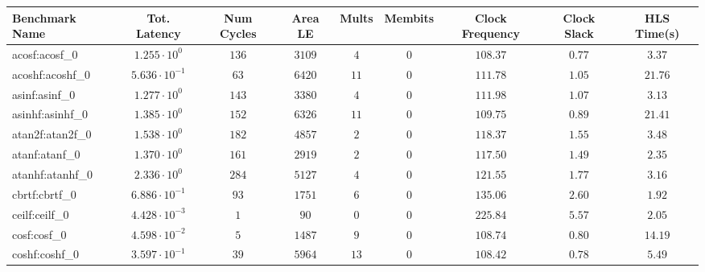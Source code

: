\begin{tabular}{|l|c|c|c|c|c|c|c|c|}
\hline
Benchmark Name               & Tot. Latency            & Num Cycles & Area LE    & Mults   & Membits & Clock Frequency & Clock Slack & HLS Time(s) \\
\hline
acosf:acosf\_0               & $ 1.255 \cdot 10^{0}  $ & $ 136    $ & $ 3109   $ & $ 4   $ & $ 0   $ & $ 108.37      $ & $ 0.77    $ & $ 3.37    $ \\
acoshf:acoshf\_0             & $ 5.636 \cdot 10^{-1} $ & $ 63     $ & $ 6420   $ & $ 11  $ & $ 0   $ & $ 111.78      $ & $ 1.05    $ & $ 21.76   $ \\
asinf:asinf\_0               & $ 1.277 \cdot 10^{0}  $ & $ 143    $ & $ 3380   $ & $ 4   $ & $ 0   $ & $ 111.98      $ & $ 1.07    $ & $ 3.13    $ \\
asinhf:asinhf\_0             & $ 1.385 \cdot 10^{0}  $ & $ 152    $ & $ 6326   $ & $ 11  $ & $ 0   $ & $ 109.75      $ & $ 0.89    $ & $ 21.41   $ \\
atan2f:atan2f\_0             & $ 1.538 \cdot 10^{0}  $ & $ 182    $ & $ 4857   $ & $ 2   $ & $ 0   $ & $ 118.37      $ & $ 1.55    $ & $ 3.48    $ \\
atanf:atanf\_0               & $ 1.370 \cdot 10^{0}  $ & $ 161    $ & $ 2919   $ & $ 2   $ & $ 0   $ & $ 117.50      $ & $ 1.49    $ & $ 2.35    $ \\
atanhf:atanhf\_0             & $ 2.336 \cdot 10^{0}  $ & $ 284    $ & $ 5127   $ & $ 4   $ & $ 0   $ & $ 121.55      $ & $ 1.77    $ & $ 3.16    $ \\
cbrtf:cbrtf\_0               & $ 6.886 \cdot 10^{-1} $ & $ 93     $ & $ 1751   $ & $ 6   $ & $ 0   $ & $ 135.06      $ & $ 2.60    $ & $ 1.92    $ \\
ceilf:ceilf\_0               & $ 4.428 \cdot 10^{-3} $ & $ 1      $ & $ 90     $ & $ 0   $ & $ 0   $ & $ 225.84      $ & $ 5.57    $ & $ 2.05    $ \\
cosf:cosf\_0                 & $ 4.598 \cdot 10^{-2} $ & $ 5      $ & $ 1487   $ & $ 9   $ & $ 0   $ & $ 108.74      $ & $ 0.80    $ & $ 14.19   $ \\
coshf:coshf\_0               & $ 3.597 \cdot 10^{-1} $ & $ 39     $ & $ 5964   $ & $ 13  $ & $ 0   $ & $ 108.42      $ & $ 0.78    $ & $ 5.49    $ \\

\end{tabular}
